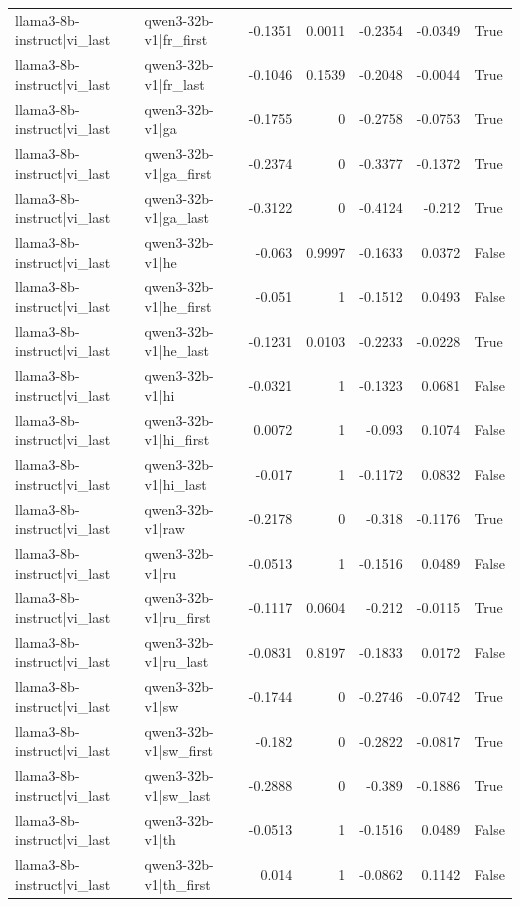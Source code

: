 \begin{table}
\begin{tabular}{l l r r r r l}
llama3-8b-instruct|vi_last & qwen3-32b-v1|fr_first & -0.1351 & 0.0011 & -0.2354 & -0.0349 & True \\
llama3-8b-instruct|vi_last & qwen3-32b-v1|fr_last & -0.1046 & 0.1539 & -0.2048 & -0.0044 & True \\
llama3-8b-instruct|vi_last & qwen3-32b-v1|ga & -0.1755 & 0 & -0.2758 & -0.0753 & True \\
llama3-8b-instruct|vi_last & qwen3-32b-v1|ga_first & -0.2374 & 0 & -0.3377 & -0.1372 & True \\
llama3-8b-instruct|vi_last & qwen3-32b-v1|ga_last & -0.3122 & 0 & -0.4124 & -0.212 & True \\
llama3-8b-instruct|vi_last & qwen3-32b-v1|he & -0.063 & 0.9997 & -0.1633 & 0.0372 & False \\
llama3-8b-instruct|vi_last & qwen3-32b-v1|he_first & -0.051 & 1 & -0.1512 & 0.0493 & False \\
llama3-8b-instruct|vi_last & qwen3-32b-v1|he_last & -0.1231 & 0.0103 & -0.2233 & -0.0228 & True \\
llama3-8b-instruct|vi_last & qwen3-32b-v1|hi & -0.0321 & 1 & -0.1323 & 0.0681 & False \\
llama3-8b-instruct|vi_last & qwen3-32b-v1|hi_first & 0.0072 & 1 & -0.093 & 0.1074 & False \\
llama3-8b-instruct|vi_last & qwen3-32b-v1|hi_last & -0.017 & 1 & -0.1172 & 0.0832 & False \\
llama3-8b-instruct|vi_last & qwen3-32b-v1|raw & -0.2178 & 0 & -0.318 & -0.1176 & True \\
llama3-8b-instruct|vi_last & qwen3-32b-v1|ru & -0.0513 & 1 & -0.1516 & 0.0489 & False \\
llama3-8b-instruct|vi_last & qwen3-32b-v1|ru_first & -0.1117 & 0.0604 & -0.212 & -0.0115 & True \\
llama3-8b-instruct|vi_last & qwen3-32b-v1|ru_last & -0.0831 & 0.8197 & -0.1833 & 0.0172 & False \\
llama3-8b-instruct|vi_last & qwen3-32b-v1|sw & -0.1744 & 0 & -0.2746 & -0.0742 & True \\
llama3-8b-instruct|vi_last & qwen3-32b-v1|sw_first & -0.182 & 0 & -0.2822 & -0.0817 & True \\
llama3-8b-instruct|vi_last & qwen3-32b-v1|sw_last & -0.2888 & 0 & -0.389 & -0.1886 & True \\
llama3-8b-instruct|vi_last & qwen3-32b-v1|th & -0.0513 & 1 & -0.1516 & 0.0489 & False \\
llama3-8b-instruct|vi_last & qwen3-32b-v1|th_first & 0.014 & 1 & -0.0862 & 0.1142 & False \\

\end{tabular}
\end{table}
